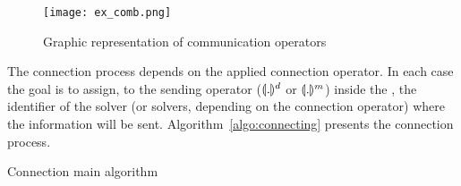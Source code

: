 \begin{figure}[h]
\centering
\texttt{[image: ex\_comb.png]}
\caption[]{Graphic representation of communication operators}
\label{fig:ex:comb}
\end{figure}

\separation


The connection process depends on the applied connection operator. In each case the goal is to assign, to the sending operator ($\llparenthesis.\rrparenthesis^d$ or $\llparenthesis.\rrparenthesis^m$) inside the \as{}, the identifier of the solver (or solvers, depending on the connection operator) where the information will be sent. Algorithm~\ref{algo:connecting} presents the connection process.

\incmargin{1.4em}
\linesnumbered
\begin{algorithm}[H]
\dontprintsemicolon
\SetLine
{}

\While{no available jacks or outlets remain}{ %
	\SSjack	$\leftarrow$ \GetNext{\Jacks}\;
	\RRoutlet $\leftarrow$ \GetNext{\Outlets}\;
	\SS $\leftarrow$ \GetSolver{\SSjack}\;	
	\RR $\leftarrow$ \GetSolver{\RRoutlet}\;
	\Connect{\Root{\SS},\SSjack, \RR} %
}
\caption{Connection main algorithm}\label{algo:connecting}
\end{algorithm}

